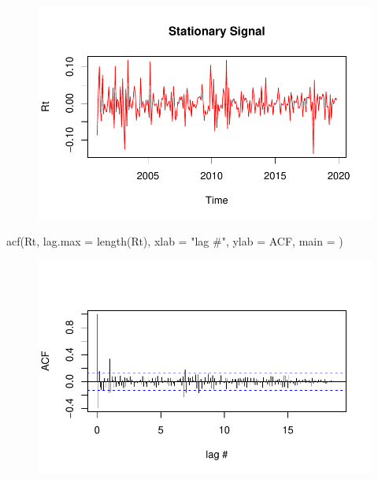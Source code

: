 \documentclass[
  letterpaper,
  DIV=11,
  numbers=noendperiod]{scrartcl}
\newenvironment{Shaded}{\begin{snugshade}}{\end{snugshade}}
\newcommand{\AttributeTok}[1]{\textcolor[rgb]{0.40,0.45,0.13}{#1}}
\newcommand{\FunctionTok}[1]{\textcolor[rgb]{0.28,0.35,0.67}{#1}}
\newcommand{\NormalTok}[1]{\textcolor[rgb]{0.00,0.23,0.31}{#1}}
\newcommand{\StringTok}[1]{\textcolor[rgb]{0.13,0.47,0.30}{#1}}
\begin{document}
\begin{figure}[H]

{\centering \includegraphics{Quarto_files/figure-pdf/unnamed-chunk-17-1.pdf}

}

\end{figure}

\begin{Shaded}
\begin{Highlighting}[]
\FunctionTok{acf}\NormalTok{(Rt, }\AttributeTok{lag.max =} \FunctionTok{length}\NormalTok{(Rt),}
    \AttributeTok{xlab =} \StringTok{"lag \#"}\NormalTok{, }\AttributeTok{ylab =} \StringTok{\textquotesingle{}ACF\textquotesingle{}}\NormalTok{, }\AttributeTok{main =} \StringTok{\textquotesingle{}\textquotesingle{}}\NormalTok{)}
\end{Highlighting}
\end{Shaded}

\begin{figure}[H]

{\centering \includegraphics{Quarto_files/figure-pdf/unnamed-chunk-17-2.pdf}

}

\end{figure}
\end{document}
